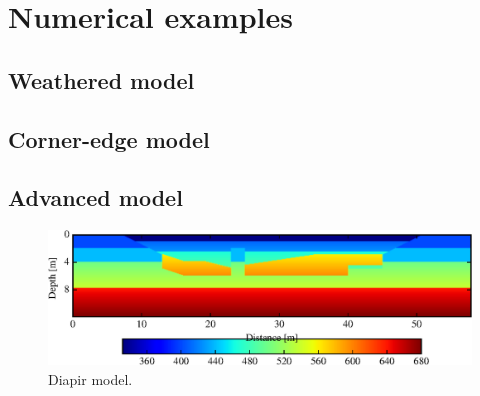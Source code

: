 \documentclass{gnulike}
\begin{document}
\chapter{Numerical examples}

\section{Weathered model}

\section{Corner-edge model}

\section{Advanced model}

\begin{figure}[!ht]
  \includegraphics[scale=0.9]{fig/perez_model.eps}
  \caption{Diapir model.}
  \label{fig:perez_model}
\end{figure}

\begin{appendices}




\end{appendices}
  



\clearpage
\newpage
\thispagestyle{empty}
\printindex
\end{document}
